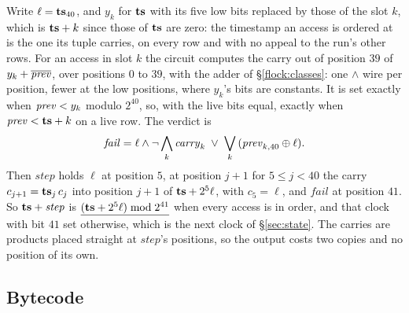 Write $\ell=\mathbf{ts}_{40}$, and $y_k$ for $\mathbf{ts}$ with its five low bits replaced by those of the slot $k$, which is $\mathbf{ts}+k$ since those of $\mathbf{ts}$ are zero: the timestamp an access is ordered at is the one its tuple carries, on every row and with no appeal to the run's other rows. For an access in slot $k$ the circuit computes the carry out of position $39$ of $y_k+\overline{\mathit{prev}}$, over positions $0$ to $39$, with the adder of \S\ref{flock:classes}: one $\wedge$ wire per position, fewer at the low positions, where $y_k$'s bits are constants. It is set exactly when $\mathit{prev}<y_k$ modulo $2^{40}$, so, with the live bits equal, exactly when $\mathit{prev}<\mathbf{ts}+k$ on a live row. The verdict is
\[
  \mathit{fail}=\ell\wedge\neg\bigwedge_k \mathit{carry}_k\;\vee\;\bigvee_k\,(\mathit{prev}_{k,40}\oplus\ell).
\]
Then $\mathit{step}$ holds $\ell$ at position $5$, at position $j+1$ for $5\le j<40$ the carry $c_{j+1}=\mathbf{ts}_j\,c_j$ into position $j+1$ of $\mathbf{ts}+2^{5}\ell$, with $c_5=\ell$, and $\mathit{fail}$ at position $41$. So $\mathbf{ts}+\mathit{step}$ is $\underline{(\mathbf{ts}+2^{5}\ell)\bmod2^{41}}$ when every access is in order, and that clock with bit $41$ set otherwise, which is the next clock of \S\ref{sec:state}. The carries are products placed straight at $\mathit{step}$'s positions, so the output costs two copies and no position of its own.

\subsection{Bytecode}\label{sec:bytecode}

